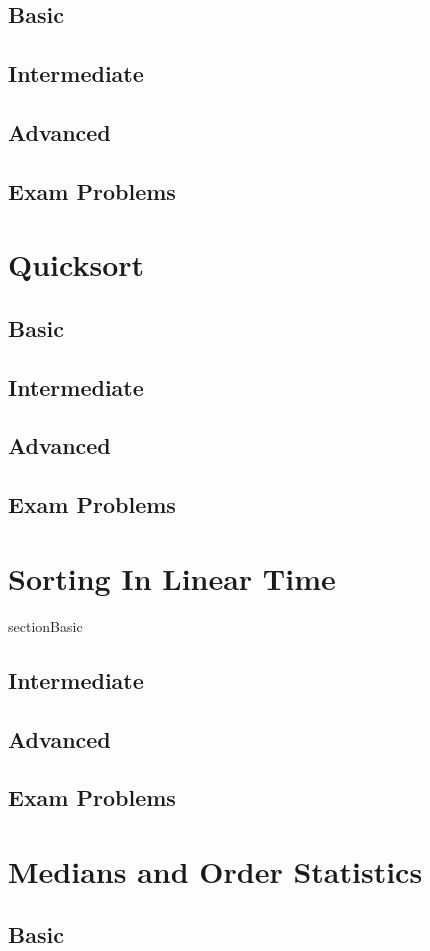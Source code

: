 \documentclass[11pt,fleqn]{book}
\begin{document}
\section{Basic}
\section{Intermediate}
\section{Advanced}
\section{Exam Problems}
\chapter{Quicksort}
\section{Basic}
\section{Intermediate}
\section{Advanced}
\section{Exam Problems}
\chapter{Sorting In Linear Time} 
section{Basic}
\section{Intermediate}
\section{Advanced}
\section{Exam Problems}
\chapter{Medians and Order Statistics}
\section{Basic}
\end{document}

